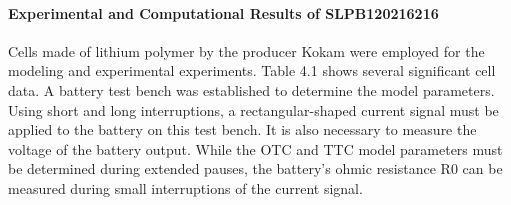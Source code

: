 \paragraph{Experimental and Computational Results of SLPB120216216 \cite{UKEMPT_AHMAD2012}}
Cells made of lithium polymer by the producer Kokam were employed for the modeling and experimental experiments.
Table 4.1 shows several significant cell data. A battery test bench was established to determine the model parameters. Using short and long interruptions, a rectangular-shaped current signal must be applied to the battery on this test bench. It is also necessary to measure the voltage of the battery output. While the OTC and TTC model parameters must be determined during extended pauses, the battery's ohmic resistance R0 can be measured during small interruptions of the current signal.



